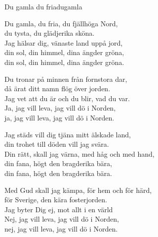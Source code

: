 \begin{song}{Du gamla du fria}{dugamla}
\begin{vers}
Du gamla, du fria, du fjällhöga Nord,\\
du tysta, du glädjerika sköna.\\
Jag hälsar dig, vänaste land uppå jord,\\
din sol, din himmel, dina ängder gröna,\\
din sol, din himmel, dina ängder gröna.\\
\end{vers}
\begin{vers}
Du tronar på minnen från fornstora dar,\\
då ärat ditt namn flög över jorden.\\
Jag vet att du är och du blir, vad du var.\\
Ja, jag vill leva, jag vill dö i Norden,\\
ja, jag vill leva, jag vill dö i Norden.\\
\end{vers}
\begin{vers}
Jag städs vill dig tjäna mitt älskade land,\\
din trohet till döden vill jag svära.\\
Din rätt, skall jag värna, med håg och med hand,\\
din fana, högt den bragderika bära,\\
din fana, högt den bragderika bära.\\
\end{vers}
\begin{vers}
Med Gud skall jag kämpa, för hem och för härd,\\
för Sverige, den kära fosterjorden.\\
Jag byter Dig ej, mot allt i en värld\\
Nej, jag vill leva, jag vill dö i Norden,\\
nej, jag vill leva, jag vill dö i Norden.\\
\end{vers}
\end{song}
